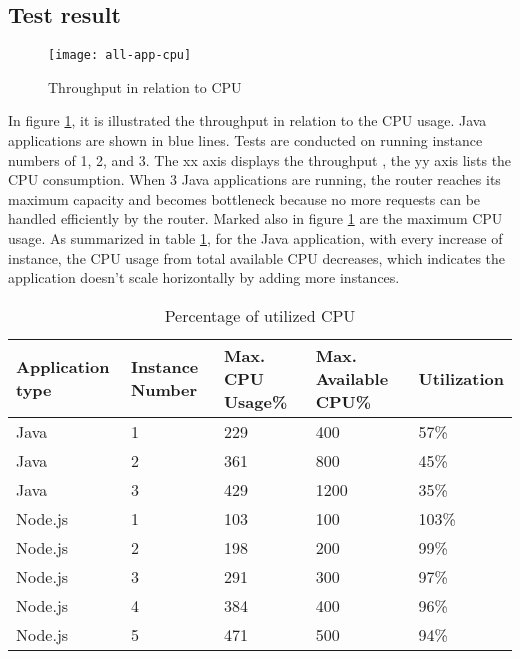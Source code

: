 \subsection{Test result}
 \begin{figure}[h]
	\centering
	\texttt{[image: all-app-cpu]}
	\caption{Throughput in relation to CPU}
	\label{all-app-cpu}
\end{figure}
In figure \ref{all-app-cpu}, it is illustrated the throughput in relation to the CPU usage. Java applications are shown in blue lines. Tests are conducted on running instance numbers of 1, 2, and 3. The xx axis displays the throughput , the yy axis lists the CPU consumption. When 3 Java applications are running, the router reaches its maximum capacity and becomes bottleneck because no more requests can be handled efficiently by the router. Marked also in figure \ref{all-app-cpu} are the maximum CPU usage. As summarized in table \ref{app-cpu-usage}, for the Java application, with every increase of instance, the CPU usage from total available CPU decreases, which indicates the application doesn't scale horizontally by adding more instances. 
\begin{table}[h]
	\caption{Percentage of utilized CPU}
	\label{app-cpu-usage}
	\renewcommand{\arraystretch}{1.2}
	\centering
	\sffamily
	\begin{footnotesize}
		\begin{tabular}{l l l l l  }
			\toprule
			\textbf{Application  type} &\textbf{Instance Number} & \textbf{Max. CPU Usage\%} & \textbf{Max. Available CPU\%}& \textbf{Utilization} }\\
		\midrule
		Java &1 	&	229	 & 400 & 57\% \\
		Java &2	&	361 & 800& 45\% \\
		Java &3	&	429  &	1200 & 35\%\\
				\midrule
			Node.js &1 	&	103	 & 100 & 103\% \\
		Node.js &2	&	198 &  200& 99\% \\
		Node.js &3	&	291 & 300 & 97\%\\
		Node.js &4	&	384 & 400 & 96\%\\
		Node.js &5	&	471 & 500 & 94\%\\
		\bottomrule
	\end{tabular}
\end{footnotesize}
\rmfamily
\end{table}

